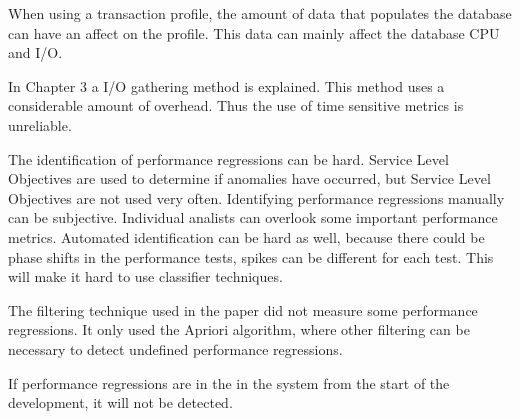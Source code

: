 When using a transaction profile, the amount of data that populates the database can have an affect on the profile. This data can mainly affect the database CPU and I/O. \cite{ghaith2015anomaly}

In Chapter 3 a I/O gathering method is explained. This method uses a considerable amount of overhead. Thus the use of time sensitive metrics is unreliable. \cite{bezemer2014detecting}

The identification of performance regressions can be hard. \cite{foo2010mining} Service Level Objectives are used to determine if anomalies have occurred, but Service Level Objectives are not used very often. Identifying performance regressions manually can be subjective. Individual analists can overlook some important performance metrics. Automated identification can be hard as well, because there could be phase shifts in the performance tests, spikes can be different for each test. This will make it hard to use classifier techniques.

The filtering technique used in the paper did not measure some performance regressions. It only used the Apriori algorithm, where other filtering can be necessary to detect undefined performance regressions.

If performance regressions are in the in the system from the start of the development, it will not be detected.

